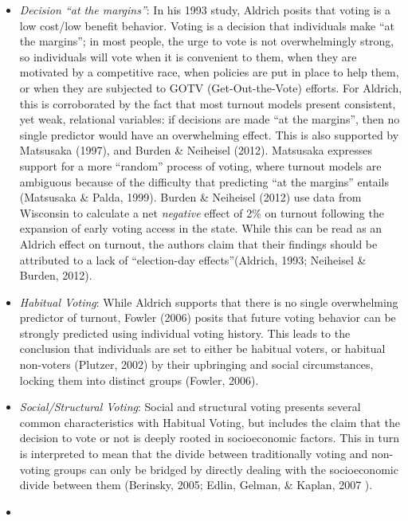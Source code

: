 \documentclass[12pt,twoside]{reedthesis}
\begin{document}
  \begin{itemize}
  \item
    \emph{Decision ``at the margins''}: In his 1993 study, Aldrich posits
    that voting is a low cost/low benefit behavior. Voting is a decision
    that individuals make ``at the margins''; in most people, the urge to
    vote is not overwhelmingly strong, so individuals will vote when it is
    convenient to them, when they are motivated by a competitive race,
    when policies are put in place to help them, or when they are
    subjected to GOTV (Get-Out-the-Vote) efforts. For Aldrich, this is
    corroborated by the fact that most turnout models present consistent,
    yet weak, relational variables: if decisions are made ``at the
    margins'', then no single predictor would have an overwhelming effect.
    This is also supported by Matsusaka (1997), and Burden \& Neiheisel
    (2012). Matsusaka expresses support for a more ``random'' process of
    voting, where turnout models are ambiguous because of the difficulty
    that predicting ``at the margins'' entails (Matsusaka \& Palda, 1999).
    Burden \& Neiheisel (2012) use data from Wisconsin to calculate a net
    \emph{negative} effect of 2\% on turnout following the expansion of
    early voting access in the state. While this can be read as an Aldrich
    effect on turnout, the authors claim that their findings should be
    attributed to a lack of ``election-day effects''(Aldrich, 1993;
    Neiheisel \& Burden, 2012).
  \item
    \emph{Habitual Voting}: While Aldrich supports that there is no single
    overwhelming predictor of turnout, Fowler (2006) posits that future
    voting behavior can be strongly predicted using individual voting
    history. This leads to the conclusion that individuals are set to
    either be habitual voters, or habitual non-voters (Plutzer, 2002) by
    their upbringing and social circumstances, locking them into distinct
    groups (Fowler, 2006).
  \item
    \emph{Social/Structural Voting}: Social and structural voting presents
    several common characteristics with Habitual Voting, but includes the
    claim that the decision to vote or not is deeply rooted in
    socioeconomic factors. This in turn is interpreted to mean that the
    divide between traditionally voting and non-voting groups can only be
    bridged by directly dealing with the socioeconomic divide between them
    (Berinsky, 2005; Edlin, Gelman, \& Kaplan, 2007 ).
  \item

\end{itemize}
\end{document}
